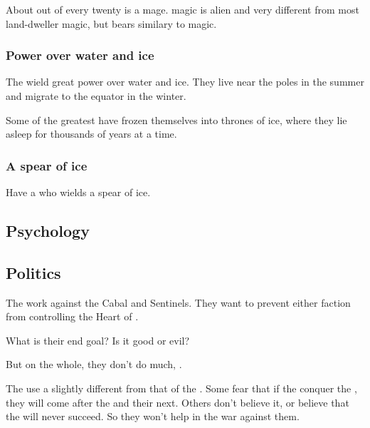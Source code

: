 About \naga{} out of every twenty is a mage. 
\Naga{} magic is alien and very different from most land-dweller magic, but bears similary to \draconic{} magic. 





\subsubsection{Power over water and ice}
The \nagae{} wield great power over water and ice. They live near the poles in the summer and migrate to the equator in the winter. 

Some of the greatest \nagalords{} have frozen themselves into thrones of ice, where they lie asleep for thousands of years at a time. 





\subsubsection{A spear of ice}
Have a \naga{} who wields a spear of ice. 








\subsection{Psychology}







\subsection{Politics}
The \nagae{} work against the Cabal and Sentinels. They want to prevent either faction from controlling the Heart of \Miith{}. 

What is their end goal? Is it good or evil? 

But on the whole, they don't do much, . 

The \nagae{} use a \dweomer{} slightly different from that of the \dragons. 
Some fear that if the \banes{} conquer the \dragons, they will come after the \nagae{} and their \dweomer{} next. 
Others don't believe it, or believe that the \banes{} will never succeed. 
So they won't help in the war against them. 





